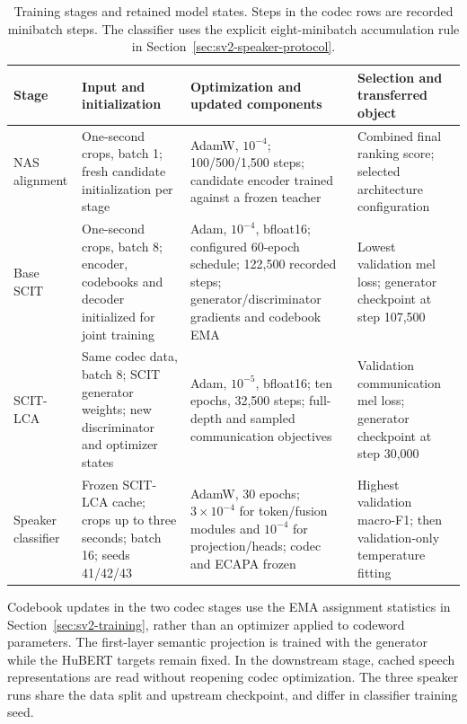 \begin{table}[t]
\centering
\caption{Training stages and retained model states. Steps in the codec rows are recorded minibatch steps. The classifier uses the explicit eight-minibatch accumulation rule in Section~\ref{sec:sv2-speaker-protocol}.}
\label{tab:sv3-training-stages}
\small
\begin{tabularx}{\textwidth}{@{}>{\raggedright\arraybackslash}p{}>{\raggedright\arraybackslash}p{}Y>{\raggedright\arraybackslash}p{0.23\textwidth}@{}}
\toprule
Stage & Input and initialization & Optimization and updated components & Selection and transferred object\\
\midrule
NAS alignment & One-second crops, batch 1; fresh candidate initialization per stage & AdamW, $10^{-4}$; 100/500/1,500 steps; candidate encoder trained against a frozen teacher & Combined final ranking score; selected architecture configuration\\
Base SCIT & One-second crops, batch 8; encoder, codebooks and decoder initialized for joint training & Adam, $10^{-4}$, bfloat16; configured 60-epoch schedule; 122,500 recorded steps; generator/discriminator gradients and codebook EMA & Lowest validation mel loss; generator checkpoint at step 107,500\\
SCIT-LCA & Same codec data, batch 8; SCIT generator weights; new discriminator and optimizer states & Adam, $10^{-5}$, bfloat16; ten epochs, 32,500 steps; full-depth and sampled communication objectives & Validation communication mel loss; generator checkpoint at step 30,000\\
Speaker classifier & Frozen SCIT-LCA cache; crops up to three seconds; batch 16; seeds 41/42/43 & AdamW, 30 epochs; $3\times10^{-4}$ for token/fusion modules and $10^{-4}$ for projection/heads; codec and ECAPA frozen & Highest validation macro-F1; then validation-only temperature fitting\\
\bottomrule
\end{tabularx}
\end{table}

Codebook updates in the two codec stages use the EMA assignment statistics in Section~\ref{sec:sv2-training}, rather than an optimizer applied to codeword parameters. The first-layer semantic projection is trained with the generator while the HuBERT targets remain fixed. In the downstream stage, cached speech representations are read without reopening codec optimization. The three speaker runs share the data split and upstream checkpoint, and differ in classifier training seed.

